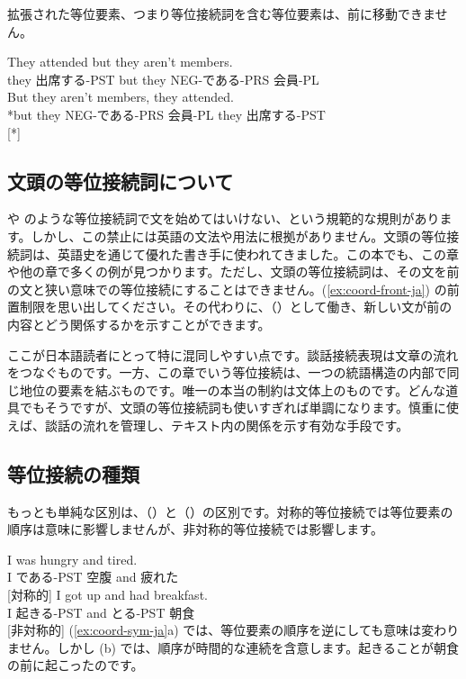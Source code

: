 拡張された等位要素、つまり等位接続詞を含む等位要素は、前に移動できません。

\ea \label{ex:coord-front-ja}
    \ea \gll They attended but they aren't members.\\
        they 出席する-PST but they NEG-である-PRS 会員-PL\\
    \glt {}
    \ex \gll *But they aren't members, they attended.\\
        *but they NEG-である-PRS 会員-PL they 出席する-PST\\
    \glt {} [*]
    \z
\z

\subsection{文頭の等位接続詞について}

 や  のような等位接続詞で文を始めてはいけない、という規範的な規則があります。しかし、この禁止には英語の文法や用法に根拠がありません。文頭の等位接続詞は、英語史を通じて優れた書き手に使われてきました。この本でも、この章や他の章で多くの例が見つかります。ただし、文頭の等位接続詞は、その文を前の文と狭い意味での等位接続にすることはできません。(\ref{ex:coord-front-ja}) の前置制限を思い出してください。その代わりに、（）として働き、新しい文が前の内容とどう関係するかを示すことができます。

ここが日本語読者にとって特に混同しやすい点です。談話接続表現は文章の流れをつなぐものです。一方、この章でいう等位接続は、一つの統語構造の内部で同じ地位の要素を結ぶものです。唯一の本当の制約は文体上のものです。どんな道具でもそうですが、文頭の等位接続詞も使いすぎれば単調になります。慎重に使えば、談話の流れを管理し、テキスト内の関係を示す有効な手段です。

\subsection{等位接続の種類}

もっとも単純な区別は、（）と（）の区別です。対称的等位接続では等位要素の順序は意味に影響しませんが、非対称的等位接続では影響します。

\ea \label{ex:coord-sym-ja}
    \ea \gll I was hungry and tired.\\
        I である-PST 空腹 and 疲れた\\
    \glt {} [対称的]
    \ex \gll I got up and had breakfast.\\
        I 起きる-PST and とる-PST 朝食\\
    \glt {} [非対称的]
    \z
\z
(\ref{ex:coord-sym-ja}a) では、等位要素の順序を逆にしても意味は変わりません。しかし (b) では、順序が時間的な連続を含意します。起きることが朝食の前に起こったのです。

